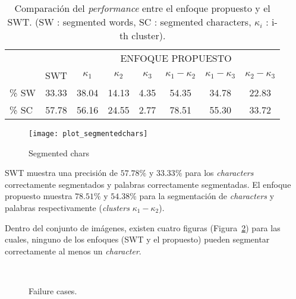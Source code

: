 \begin{table}[h]
\centering
\begin{tabular}{ll|r|l|l|l|l|l|}
\cline{3-8}
\multicolumn{1}{c}{}                    &                           & \multicolumn{6}{|c|}{ENFOQUE PROPUESTO}   \\ \cline{2-8} 
                                        & \multicolumn{1}{|c|}{SWT} & \multicolumn{1}{|c|}{$\kappa_1$} & \multicolumn{1}{|c|}{$\kappa_2$} & \multicolumn{1}{|c|}{$\kappa_3$} & \multicolumn{1}{|c|}{$\kappa_1-\kappa_2$} & \multicolumn{1}{|c|}{$\kappa_1-\kappa_3$} & \multicolumn{1}{|c|}{$\kappa_2-\kappa_3$} \\ \hline
\multicolumn{1}{|l}{\% SW} & \multicolumn{1}{|c|}{33.33}&\multicolumn{1}{|c|}{38.04}&\multicolumn{1}{|c|}{14.13}&\multicolumn{1}{|c|}{4.35}&\multicolumn{1}{|c|}{54.35}&\multicolumn{1}{|c|}{34.78}&\multicolumn{1}{|c|}{22.83}\\ \hline
\multicolumn{1}{|l}{\% SC} & \multicolumn{1}{|c|}{57.78}&\multicolumn{1}{|c|}{56.16}&\multicolumn{1}{|c|}{24.55}&\multicolumn{1}{|c|}{2.77}&\multicolumn{1}{|c|}{78.51}&\multicolumn{1}{|c|}{55.30}&\multicolumn{1}{|c|}{33.72}\\ \hline
\end{tabular}
\caption[Comparación del \textit{performance}]{Comparación del 
\textit{performance} entre el enfoque propuesto y el SWT. (SW : segmented words,
SC : segmented characters, $\kappa_i$ : i-th cluster).}
\label{tab:results}
\end{table}

\begin{figure}[h!]
	\texttt{[image: plot\_segmentedchars]}
	\caption{Segmented chars}
	\label{fig:cap-resultados:segchars}
\end{figure}

SWT muestra una precisión de $57.78\%$ y $33.33\%$ para los \textit{characters} 
correctamente segmentados y palabras correctamente segmentadas. El enfoque
propuesto muestra $78.51\%$ y $54.38\%$ para la segmentación de
\textit{characters} y palabras respectivamente (\textit{clusters}
$\kappa_1-\kappa_2$).

Dentro del conjunto de imágenes, existen cuatro figuras 
(Figura~\ref{Fig:cap-resultados:failure}) para las cuales, ninguno de los
enfoques (SWT y el propuesto) pueden segmentar correctamente al menos un
\textit{character}. 

\begin{figure}[h!]%
\centering
{} { }
\\
 { }
\caption{Failure cases.}
\label{Fig:cap-resultados:failure}
\end{figure}

